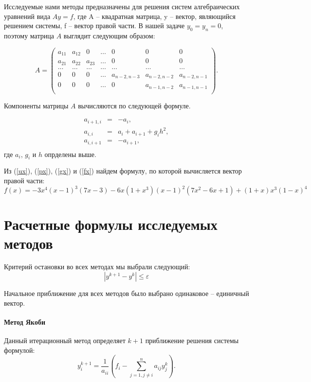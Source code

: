 Исследуемые нами методы предназначены для решения систем алгебраических уравнений вида $Ay=f$, где A -- квадратная матрица, y -- вектор, являющийся решением системы, f -- вектор правой части.
В нашей задаче $y_0 = y_n = 0$,  поэтому матрица $A$ выглядит следующим образом:

$$
	A = 
	\left(
	\begin{array}{ccccccc}
		a_{1 1}&a_{1 2}&0&\dots&0&0&0\\
		a_{2 1}&a_{2 2}&a_{2 3}&\dots&0&0&0\\
		\dots&\dots&\dots&\dots&\dots&\dots&\dots\\
		0&0&0&\dots&a_{n-2, n-3}&a_{n-2, n-2}&a_{n-2, n-1}\\
		0&0&0&\dots&0&a_{n-1, n-2}&a_{n-1, n-1}\\
	\end{array}
	\right).
$$

Компоненты матрицы $A$ вычисляются по следующей формуле.

\begin{equation}
	\begin{array}{rcl}
		a_{i+1,i}&=&-a_i,\\
		a_{i, i}&=&a_i+a_{i+1}+g_ih^2,\\
		a_{i, i+1}&=&-a_{i+1},\\
	\end{array}
\end{equation}
где $a_i$, $g_i$ и $h$ опрделены выше.

Из (\ref{ux}), (\ref{px}), (\ref{gx}) и (\ref{fx}) найдем формулу, по которой вычисляется вектор правой части: $$f(x) = -3x^4(x-1)^3(7x-3)-6x(1+x^3)(x-1)^2(7x^2-6x+1)+(1+x)x^3(1-x)^4$$

\section{Расчетные формулы исследуемых методов}
Критерий остановки во всех методах мы выбрали следующий:
\begin{equation}
	\left| y^{k+1} - y^k \right| \leq \varepsilon
\end{equation}

Начальное приближение для всех методов было выбрано одинаковое -- единичный вектор.

\paragraph{Метод Якоби}
Данный итерационный метод определяет $k+1$ приближение решения системы формулой:
\begin{equation}
	y^{k+1}_i = \frac{1}{a_{i i}}\left(f_i - \sum^n_{j=1, j \neq i} a_{i j}y^k_j \right).
\end{equation}

